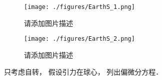 
\begin{issues}
\issueDraft
\end{issues}

\begin{figure}[ht]
\centering
\texttt{[image: ./figures/EarthS\_1.png]}
\caption{请添加图片描述} \label{EarthS_fig1}
\end{figure}

\begin{figure}[ht]
\centering
\texttt{[image: ./figures/EarthS\_2.png]}
\caption{请添加图片描述} \label{EarthS_fig2}
\end{figure}

只考虑自转， 假设引力在球心， 列出偏微分方程．
